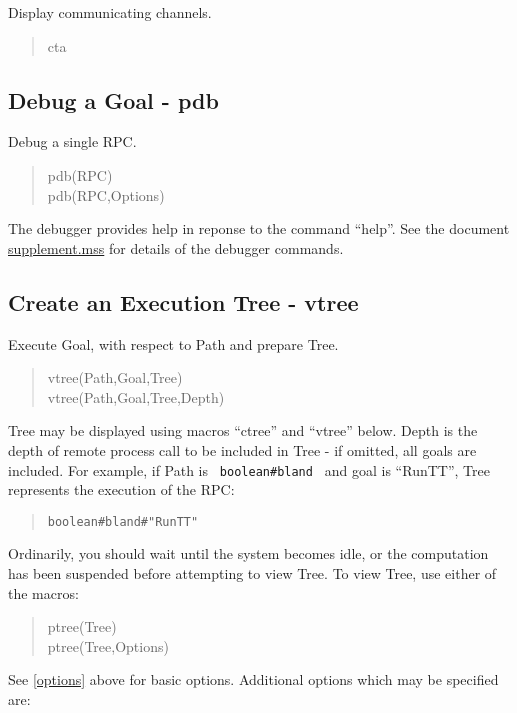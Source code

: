 Display communicating channels.

\label{cta}
\begin{verse}
    cta
\end{verse}

\subsection{Debug a Goal - pdb}

Debug a single RPC.

\begin{verse}
    pdb(RPC) \\
    pdb(RPC,Options)
\end{verse}

\noindent
The debugger provides help in reponse to the command ``help''.
See the document \underline{supplement.mss} for details of the debugger
commands.

\subsection{Create an Execution Tree - vtree}

Execute Goal, with respect to Path and prepare Tree.

\begin{verse}
    vtree(Path,Goal,Tree) \\
    vtree(Path,Goal,Tree,Depth)
\end{verse}

\noindent
Tree may be displayed using macros ``ctree'' and ``vtree'' below.
Depth is the depth of remote process call to be included in Tree -
if omitted, all goals are included.
For example, if Path is \verb+ boolean#bland +
and goal is ``RunTT'', Tree represents the execution of the RPC:

\begin{verse}
    \verb+boolean#bland#"RunTT"+
\end{verse}

\noindent
Ordinarily, you should wait until the system becomes idle, or the
computation has been suspended before attempting to view Tree.
To view Tree, use either of the macros:

\begin{verse}
    ptree(Tree) \\
    ptree(Tree,Options)
\end{verse}

\noindent
See \ref{options} above for basic options.
Additional options which may be specified are:

